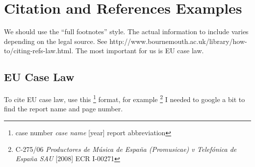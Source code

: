 \section{Citation and References Examples}

We should use the ``full footnotes'' style.  The actual information to include
varies depending on the legal source.  See
http://www.bournemouth.ac.uk/library/how-to/citing-refs-law.html. The most
important for us is EU case law.

\subsection{EU Case Law}

To cite EU case law, use this \footnote{case number \emph{case name} [year]
report abbreviation} format, for example \footnote{C-275/06 \emph{Productores
de Música de España (Promusicae) v Telefónica de España SAU} [2008] ECR
I-00271} I needed to google a bit to find the report name and page number.
